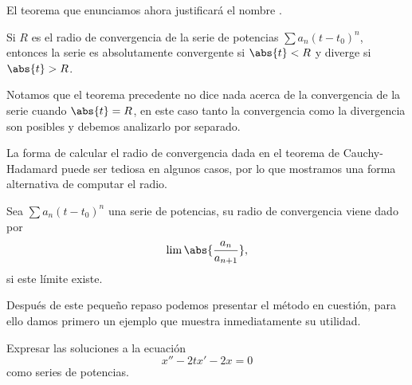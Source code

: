 \documentclass[../ecuaciones_diferenciales.tex]{subfiles}
\begin{document}
El teorema que enunciamos ahora justificará el nombre .

\begin{theorem}
	Si \(R\) es el radio de convergencia de la serie de potencias 
	\(\sum a_n (t - t_0)^n\), entonces la serie es absolutamente convergente si 
	\(\abs{t} < R\) y diverge si \(\abs{t} > R\).
\end{theorem}

\begin{remark}
	Notamos que el teorema precedente no dice nada acerca de la convergencia de
	la serie cuando \(\abs{t} = R\), en este caso tanto la convergencia como la
	divergencia son posibles y debemos analizarlo por separado.
\end{remark}

La forma de calcular el radio de convergencia dada en el teorema de
Cauchy-Hadamard puede ser tediosa en algunos casos, por lo que mostramos una
forma alternativa de computar el radio.

\begin{lemma}
	Sea \(\sum a_n (t - t_0)^n\) una serie de potencias, su radio de
	convergencia viene dado por
	\[\lim\abs{\frac{a_n}{a_{n + 1}}},\]
	si este límite existe.
\end{lemma}

Después de este pequeño repaso podemos presentar el método en cuestión, para
ello damos primero un ejemplo que muestra inmediatamente su utilidad.
\begin{example}
	Expresar las soluciones a la ecuación
	\begin{equation} \label{eq:eqpot}
		x''-2tx'-2x=0
	\end{equation}
	como series de potencias.
\end{example}
\end{document}

